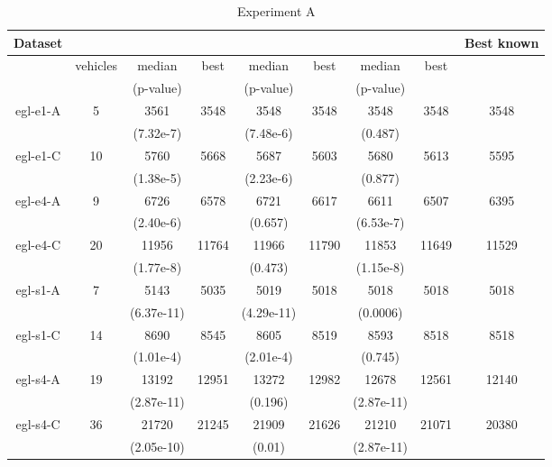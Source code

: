 \documentclass[twoside]{ctuthesis}
\theoremstyle{plain}
\theoremstyle{definition}
\theoremstyle{note}
\begin{document}
\begin{table}[htbp]
	\centering
	\caption{Experiment A}
	\label{tab:tablea}
	\begin{tabular}{|c|c|cc|cc|cc|c|}
		\hline
		\textbf{Dataset}&&\multicolumn{2}{c|}{\textbf{\nnsrvanilla}}&\multicolumn{2}{c|}{\textbf{\nnsrnode100}}&\multicolumn{2}{c|}{\textbf{\nnsredge}}&\textbf{Best known} \\ \hline
		&vehicles&median&best&median&best&median&best& \\
		&&(p-value)&&(p-value)&&(p-value)&&\\
		\hline
		egl-e1-A &5& 3561&3548&3548&3548&3548&3548&3548 \\
		&&(7.32e-7)&& (7.48e-6)&& (0.487)&& \\ \hline
		egl-e1-C &10& 5760&5668&5687&5603&5680&5613&5595\\
		&&(1.38e-5)&& (2.23e-6)&& (0.877)&& \\ \hline
		egl-e4-A &9& 6726&6578&6721&6617&6611&6507&6395\\
		&&(2.40e-6)&& (0.657)&& (6.53e-7)&& \\ \hline
		egl-e4-C &20& 11956&11764&11966&11790&11853&11649&11529 \\
		&&(1.77e-8)&& (0.473)&& (1.15e-8)&& \\ \hline
		egl-s1-A &7& 5143&5035&5019&5018&5018&5018&5018 \\
		&&(6.37e-11)&& (4.29e-11)&& (0.0006)&& \\ \hline
		egl-s1-C &14& 8690&8545&8605&8519&8593&8518&8518\\
		&&(1.01e-4)&& (2.01e-4)&& (0.745)&& \\ \hline
		egl-s4-A &19& 13192&12951&13272&12982&12678&12561&12140 \\
		&&(2.87e-11)&& (0.196)&& (2.87e-11)&& \\ \hline
		egl-s4-C &36& 21720&21245&21909&21626&21210&21071&20380\\
		&&(2.05e-10)&& (0.01)&& (2.87e-11)&& \\ \hline
	\end{tabular}
\end{table}
\end{document}
